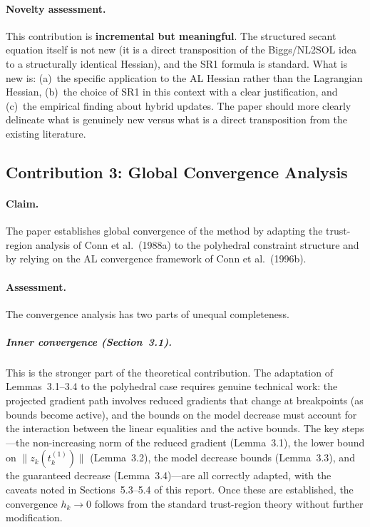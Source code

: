 \documentclass[11pt]{article}
\theoremstyle{plain}
\begin{document}
\paragraph{Novelty assessment.} This contribution is \textbf{incremental but meaningful}. The structured secant equation itself is not new (it is a direct transposition of the Biggs/NL2SOL idea to a structurally identical Hessian), and the SR1 formula is standard. What is new is: (a)~the specific application to the AL Hessian rather than the Lagrangian Hessian, (b)~the choice of SR1 in this context with a clear justification, and (c)~the empirical finding about hybrid updates. The paper should more clearly delineate what is genuinely new versus what is a direct transposition from the existing literature.

\subsection{Contribution 3: Global Convergence Analysis}

\paragraph{Claim.} The paper establishes global convergence of the method by adapting the trust-region analysis of Conn et al.\ (1988a) to the polyhedral constraint structure and by relying on the AL convergence framework of Conn et al.\ (1996b).

\paragraph{Assessment.} The convergence analysis has two parts of unequal completeness.

\subparagraph{Inner convergence (Section~3.1).} This is the stronger part of the theoretical contribution. The adaptation of Lemmas~3.1--3.4 to the polyhedral case requires genuine technical work: the projected gradient path involves reduced gradients that change at breakpoints (as bounds become active), and the bounds on the model decrease must account for the interaction between the linear equalities and the active bounds. The key steps---the non-increasing norm of the reduced gradient (Lemma~3.1), the lower bound on $\|z_k(t_k^{(1)})\|$ (Lemma~3.2), the model decrease bounds (Lemma~3.3), and the guaranteed decrease (Lemma~3.4)---are all correctly adapted, with the caveats noted in Sections~5.3--5.4 of this report. Once these are established, the convergence $h_k \to 0$ follows from the standard trust-region theory without further modification.
\end{document}

